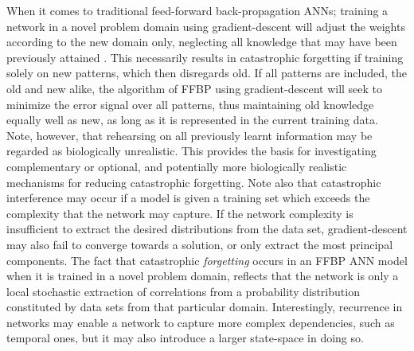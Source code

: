 When it comes to traditional feed-forward back-propagation ANNs; training a network in a novel problem domain using gradient-descent will adjust the weights according to the new domain only, neglecting all knowledge that may have been previously attained \citep{McCloskey1989, French1999, French2001}. This necessarily results in catastrophic forgetting if training solely on new patterns, which then disregards old. If all patterns are included, the old and new alike, the algorithm of FFBP using gradient-descent will seek to minimize the error signal over all patterns, thus maintaining old knowledge equally well as new, as long as it is represented in the current training data. Note, however, that rehearsing on all previously learnt information may be regarded as biologically unrealistic. This provides the basis for investigating complementary or optional, and potentially more biologically realistic mechanisms for reducing catastrophic forgetting.
Note also that catastrophic interference may occur if a model is given a training set which exceeds the complexity that the network may capture. If the network complexity is insufficient to extract the desired distributions from the data set, gradient-descent may also fail to converge towards a solution, or only extract the most principal components.
The fact that catastrophic \textit{forgetting} occurs in an FFBP ANN model when it is trained in a novel problem domain, reflects that the network is only a local stochastic extraction of correlations from a probability distribution constituted by data sets from that particular domain. Interestingly, recurrence in networks may enable a network to capture more complex dependencies, such as temporal ones, but it may also introduce a larger state-space in doing so.
\\

